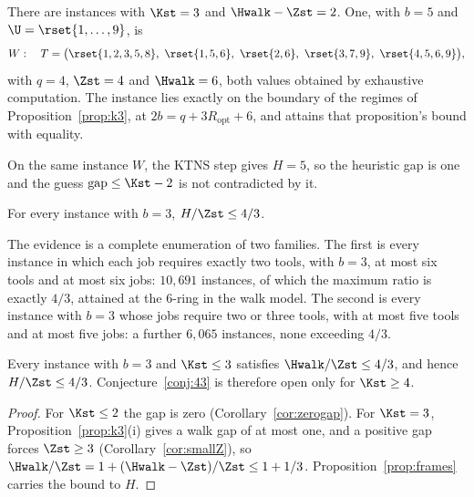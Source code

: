 \begin{proposition}\label{prop:refute}
There are instances with $\Kst=3$ and $\Hwalk-\Zst=2$. One, with $b=5$ and
$\U=\rset{1,\dots,9}$, is
\[
  W:\quad T=\bigl(\rset{1,2,3,5,8},\ \rset{1,5,6},\ \rset{2,6},\ \rset{3,7,9},\
  \rset{4,5,6,9}\bigr),
\]
with $q=4$, $\Zst=4$ and $\Hwalk=6$, both values obtained by exhaustive computation.
The instance lies exactly on the boundary of the regimes of
Proposition~\ref{prop:k3}, at $2b=q+3R_{\mathrm{opt}}+6$, and attains that
proposition's bound with equality.
\end{proposition}

\begin{observation}\label{obs:refute-ktns}
On the same instance $W$, the KTNS step gives $H=5$, so the heuristic gap is one and
the guess $\mathrm{gap}\le\Kst-2$ is not contradicted by it.
\end{observation}

\begin{conjecture}[The $4/3$ ratio at $b=3$]\label{conj:43}
For every instance with $b=3$, $H/\Zst\le4/3$.
\end{conjecture}

The evidence is a complete enumeration of two families. The first is every instance
in which each job requires exactly two tools, with $b=3$, at most six tools and at
most six jobs: $10{,}691$ instances, of which the maximum ratio is exactly $4/3$,
attained at the $6$-ring in the walk model. The second is every instance with $b=3$
whose jobs require two or three tools, with at most five tools and at most five jobs:
a further $6{,}065$ instances, none exceeding $4/3$.

\begin{proposition}\label{prop:43route}
Every instance with $b=3$ and $\Kst\le3$ satisfies $\Hwalk/\Zst\le4/3$, and hence
$H/\Zst\le4/3$. Conjecture~\ref{conj:43} is therefore open only for $\Kst\ge4$.
\end{proposition}

\begin{proof}
For $\Kst\le2$ the gap is zero (Corollary~\ref{cor:zerogap}). For $\Kst=3$,
Proposition~\ref{prop:k3}(i) gives a walk gap of at most one, and a positive gap
forces $\Zst\ge3$ (Corollary~\ref{cor:smallZ}), so
$\Hwalk/\Zst=1+(\Hwalk-\Zst)/\Zst\le1+1/3$. Proposition~\ref{prop:frames} carries the
bound to $H$.
\end{proof}

